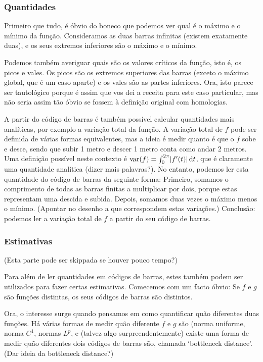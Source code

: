 \documentclass{article}
\theoremstyle{nonumberplain}
\DeclarePairedDelimiter{\abs}{\lvert}{\rvert}
\begin{document}
\subsubsection{Quantidades}

Primeiro que tudo, é óbvio do boneco que podemos ver qual é o máximo e o mínimo da função. Consideramos as duas barras infinitas (existem exatamente duas), e os seus extremos inferiores são o máximo e o mínimo.

Podemos também averiguar quais são os valores críticos da função, isto é, os picos e vales. Os picos são os extremos superiores das barras (exceto o máximo global, que é um caso aparte) e os vales são as partes inferiores. Ora, isto parece ser tautológico porque é assim que vos dei a receita para este caso particular, mas não seria assim tão óbvio se fossem à definição original com homologias.

A partir do código de barras é também possível calcular quantidades mais analíticas, por exemplo a variação total da função. A variação total de $f$ pode ser definida de várias formas equivalentes, mas a ideia é medir quanto é que o $f$ sobe e desce, sendo que subir 1 metro e descer 1 metro conta como andar 2 metros. Uma definição possível neste contexto é $\mathop{\mathrm{var}}(f) = \int_0^{2\pi} \abs{f'(t)} \dl t$, que é claramente uma quantidade analítica (dizer mais palavras?). No entanto, podemos ler esta quantidade do código de barras da seguinte forma: Primeiro, somamos o comprimento de todas as barras finitas a multiplicar por dois, porque estas representam uma descida e subida. Depois, somamos duas vezes o máximo menos o mínimo. (Apontar no desenho a que correspondem estas variações.) Conclusão: podemos ler a variação total de $f$ a partir do seu código de barras.

\subsubsection{Estimativas}

(Esta parte pode ser skippada se houver pouco tempo?)

Para além de ler quantidades em códigos de barras, estes também podem ser utilizados para fazer certas estimativas. Comecemos com um facto óbvio: Se $f$ e $g$ são funções distintas, os seus códigos de barras são distintos.

Ora, o interesse surge quando pensamos em como quantificar quão diferentes duas funções. Há várias formas de medir quão diferente $f$ e $g$ são (norma uniforme, norma $C^1$, normas $L^p$, e (talvez algo surpreendentemente) existe uma forma de medir quão diferentes dois códigos de barras são, chamada `bottleneck distance'. (Dar ideia da bottleneck distance?)
\end{document}
